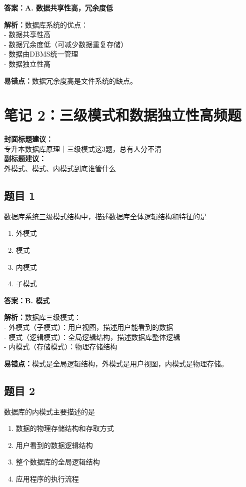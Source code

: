 \documentclass[12pt,a4paper]{ctexart}
\begin{document}
\begin{answerbox}
	\textbf{答案：A. 数据共享性高，冗余度低}

	\textbf{解析：}数据库系统的优点：\\
	- 数据共享性高\\
	- 数据冗余度低（可减少数据重复存储）\\
	- 数据由DBMS统一管理\\
	- 数据独立性高

	\textbf{易错点：}数据冗余度高是文件系统的缺点。
\end{answerbox}

\newpage

\section{笔记 2：三级模式和数据独立性高频题}
\begin{coverbox}
	\textbf{封面标题建议：}\\
	专升本数据库原理｜三级模式这3题，总有人分不清\\
	\textbf{副标题建议：}\\
	外模式、模式、内模式到底谁管什么
\end{coverbox}

\subsection*{题目 1}
数据库系统三级模式结构中，描述数据库全体逻辑结构和特征的是
\begin{enumerate}[label=\Alph*.]
	\item 外模式
	\item 模式
	\item 内模式
	\item 子模式
\end{enumerate}

\begin{answerbox}
	\textbf{答案：B. 模式}

	\textbf{解析：}数据库三级模式：\\
	- 外模式（子模式）：用户视图，描述用户能看到的数据\\
	- 模式（逻辑模式）：全局逻辑结构，描述数据库整体逻辑\\
	- 内模式（存储模式）：物理存储结构

	\textbf{易错点：}模式是全局逻辑结构，外模式是用户视图，内模式是物理存储。
\end{answerbox}

\subsection*{题目 2}
数据库的内模式主要描述的是
\begin{enumerate}[label=\Alph*.]
	\item 数据的物理存储结构和存取方式
	\item 用户看到的数据逻辑结构
	\item 整个数据库的全局逻辑结构
	\item 应用程序的执行流程
\end{enumerate}
\end{document}
